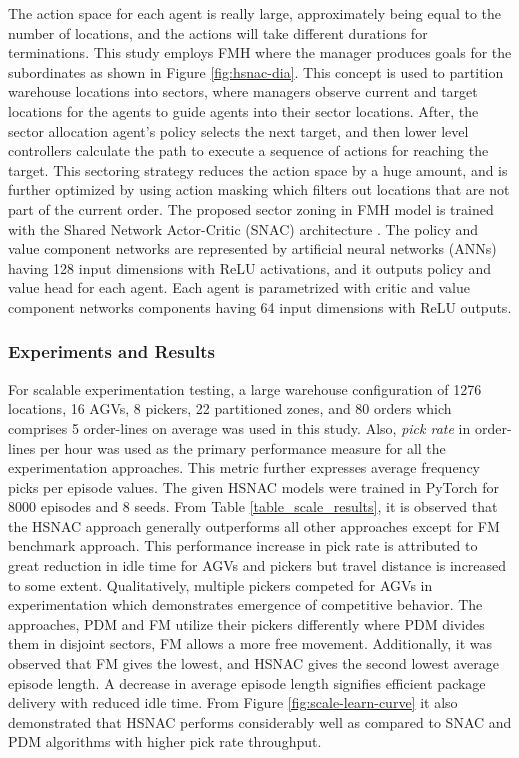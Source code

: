 \documentclass{article}
\begin{document}
The action space for each agent is really large, approximately being equal to the number of locations, and the actions will take different durations for terminations.
This study employs FMH where the manager produces goals for the subordinates as shown in Figure \ref{fig:hsnac-dia}.
This concept is used to partition warehouse locations into sectors, where managers observe current and target locations for the agents to guide agents into their sector locations.
After, the sector allocation agent’s policy selects the next target, and then lower level controllers calculate the path to execute a sequence of actions for reaching the target.
This sectoring strategy reduces the action space by a huge amount, and is further optimized by using action masking which filters out locations that are not part of the current order.
The proposed sector zoning in FMH model is trained with the Shared Network Actor-Critic (SNAC) architecture \cite{christianos2020shared}.
The policy and value component networks are represented by artificial neural networks (ANNs) having 128 input dimensions with ReLU activations, and it outputs policy and value head for each agent.
Each agent is parametrized with critic and value component networks components having 64 input dimensions with ReLU outputs.


\subsubsection{Experiments and Results}


For scalable experimentation testing, a large warehouse configuration of 1276 locations, 16 AGVs, 8 pickers, 22 partitioned zones, and 80 orders which comprises 5 order-lines on average was used in this study.
Also, \textit{pick rate} in order-lines per hour was used as the primary performance measure for all the experimentation approaches.
This metric further expresses average frequency picks per episode values.
The given HSNAC models were trained in PyTorch for 8000 episodes and 8 seeds.
From Table \ref{table_scale_results}, it is observed that the HSNAC approach generally outperforms all other approaches except for FM benchmark approach.
This performance increase in pick rate is attributed to great reduction in idle time for AGVs and pickers but travel distance is increased to some extent.
Qualitatively, multiple pickers competed for AGVs in experimentation which demonstrates emergence of competitive behavior.
The approaches, PDM and FM utilize their pickers differently where PDM divides them in disjoint sectors, FM allows a more free movement.
Additionally, it was observed that FM gives the lowest, and HSNAC gives the second lowest average episode length.
A decrease in average episode length signifies efficient package delivery with reduced idle time.
From Figure \ref{fig:scale-learn-curve} it also demonstrated that HSNAC performs considerably well as compared to SNAC and PDM algorithms with higher pick rate throughput.
\end{document}
